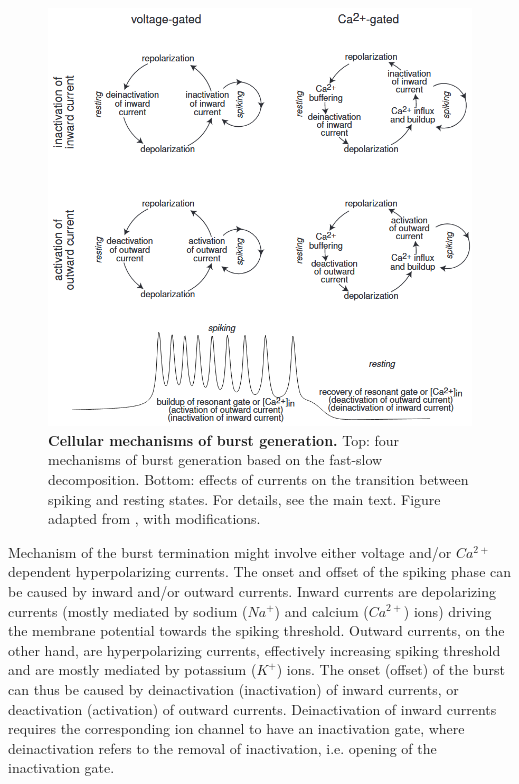 \documentclass[../main.tex]{subfiles}
\begin{document}
\begin{figure}[!t]
    \centering
    \includegraphics[width=0.85\linewidth]{../img/modeling_r5/examples/bursting_ionic_basis.png}
    \caption[Cellular mechanisms of burst generation]{
        \textbf{Cellular mechanisms of burst generation.}
        Top: four mechanisms of burst generation based on the fast-slow decomposition. Bottom: effects of currents on the transition between spiking and resting states.
        For details, see the main text.
        Figure adapted from \parencite{izhikevichDynamicalSystemsNeuroscience2006}, with modifications.
    }
    \label{fig:ionic_basis_for_slow_fast_bursting}
\end{figure}

Mechanism of the burst termination might involve either voltage and/or $Ca^{2+}$ dependent hyperpolarizing currents.
The onset and offset of the spiking phase can be caused by inward and/or outward currents. Inward currents are depolarizing currents (mostly mediated by sodium ($Na^+$) and calcium ($Ca^{2+}$) ions) driving the membrane potential towards the spiking threshold. Outward currents, on the other hand, are hyperpolarizing currents, effectively increasing spiking threshold and are mostly mediated by potassium ($K^+$) ions.
The onset (offset) of the burst can thus be caused by deinactivation (inactivation) of inward currents, or deactivation (activation) of outward currents. Deinactivation of inward currents requires the corresponding ion channel to have an inactivation gate, where deinactivation refers to the removal of inactivation, i.e. opening of the inactivation gate.
\end{document}
